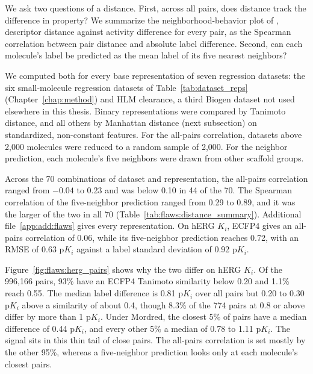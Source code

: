 We ask two questions of a distance. First, across all pairs, does distance track the difference in property? We summarize the neighborhood-behavior plot of \citet{Patterson1996}, descriptor distance against activity difference for every pair, as the Spearman correlation between pair distance and absolute label difference. Second, can each molecule's label be predicted as the mean label of its five nearest neighbors?

We computed both for every base representation of seven regression datasets: the six small-molecule regression datasets of Table~\ref{tab:dataset_reps} (Chapter~\ref{chap:method}) and HLM clearance, a third Biogen dataset not used elsewhere in this thesis. Binary representations were compared by Tanimoto distance, and all others by Manhattan distance (next subsection) on standardized, non-constant features. For the all-pairs correlation, datasets above 2,000 molecules were reduced to a random sample of 2,000. For the neighbor prediction, each molecule's five neighbors were drawn from other scaffold groups.

Across the 70 combinations of dataset and representation, the all-pairs correlation ranged from $-0.04$ to 0.23 and was below 0.10 in 44 of the 70. The Spearman correlation of the five-neighbor prediction ranged from 0.29 to 0.89, and it was the larger of the two in all 70 (Table~\ref{tab:flaws:distance_summary}). Additional file~\ref{app:add:flaws} gives every representation. On hERG $K_i$, ECFP4 gives an all-pairs correlation of 0.06, while its five-neighbor prediction reaches 0.72, with an RMSE of 0.63 p$K_i$ against a label standard deviation of 0.92 p$K_i$.

Figure~\ref{fig:flaws:herg_pairs} shows why the two differ on hERG $K_i$. Of the 996,166 pairs, 93\% have an ECFP4 Tanimoto similarity below 0.20 and 1.1\% reach 0.55. The median label difference is 0.81 p$K_i$ over all pairs but 0.20 to 0.30 p$K_i$ above a similarity of about 0.4, though 8.3\% of the 774 pairs at 0.8 or above differ by more than 1 p$K_i$. Under Mordred, the closest 5\% of pairs have a median difference of 0.44 p$K_i$, and every other 5\% a median of 0.78 to 1.11 p$K_i$. The signal sits in this thin tail of close pairs. The all-pairs correlation is set mostly by the other 95\%, whereas a five-neighbor prediction looks only at each molecule's closest pairs.

